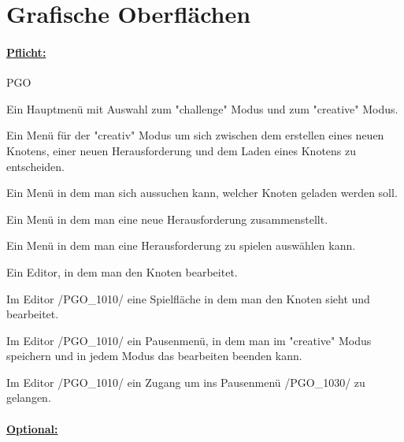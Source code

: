%
%


%
%
\clearpage


\section{Grafische Oberflächen}
\label{NU:GO}

\paragraph*{\underline{Pflicht:}}

\begin{ids}{\gls{PGO}}

	\id[0010] Ein Hauptmenü mit Auswahl zum "challenge" Modus und zum "creative" Modus.
	
	\id[0020] Ein Menü für der "creativ" Modus um sich zwischen dem erstellen eines neuen Knotens, einer neuen Herausforderung und dem Laden eines Knotens zu entscheiden.
	
	\id[0030] Ein Menü in dem man sich aussuchen kann, welcher Knoten geladen werden soll.
	
	\id[0040] Ein Menü in dem man eine neue Herausforderung zusammenstellt.
	
	\id[0050] Ein Menü in dem man eine Herausforderung zu spielen auswählen kann.
	
	\id[1010] Ein Editor, in dem man den Knoten bearbeitet.
	
	\id[1020] Im Editor /PGO\_1010/ eine Spielfläche in dem man den Knoten sieht und bearbeitet.
	
	\id[1030] Im Editor /PGO\_1010/ ein Pausenmenü, in dem man im "creative" Modus speichern und in jedem Modus das bearbeiten beenden kann.
	
	\id[1040] Im Editor /PGO\_1010/ ein Zugang um ins Pausenmenü /PGO\_1030/ zu gelangen.

\end{ids}




\paragraph*{\underline{Optional:}}

